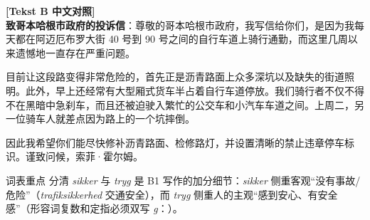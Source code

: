 \begin{transbox}
\small
\textbf{\color{NCDTeal}[Tekst B 中文对照]}\\
\textbf{致哥本哈根市政府的投诉信}：尊敬的哥本哈根市政府，我写信给你们，是因为我每天都在阿迈厄布罗大街 40 号到 90 号之间的自行车道上骑行通勤，而这里几周以来遗憾地一直存在严重问题。

目前让这段路变得非常危险的，首先正是沥青路面上众多深坑以及缺失的街道照明。此外，早上还经常有大型厢式货车半占着自行车道停放。我们骑行者不仅不得不在黑暗中急刹车，而且还被迫驶入繁忙的公交车和小汽车车道之间。上周二，另一位骑车人就差点因为路上的一个坑摔倒。

因此我希望你们能尽快修补沥青路面、检修路灯，并设置清晰的禁止违章停车标识。谨致问候，索菲·霍尔姆。
\end{transbox}


\begin{tipbox}{词表重点}
分清 \textit{sikker} 与 \textit{tryg} 是 B1 写作的加分细节：\textit{sikker} 侧重客观“没有事故/危险”（\textit{trafiksikkerhed} 交通安全），而 \textit{tryg} 侧重人的主观“感到安心、有安全感”（形容词复数和定指必须双写 \textit{g}：）。
\end{tipbox}

